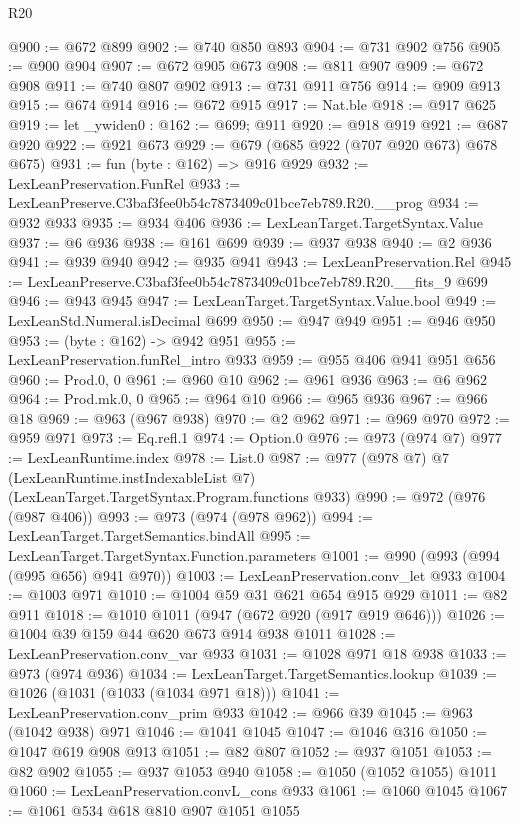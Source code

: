 \begin{lexlean}{R20}
\begin{coremodule}
@900 := @672 @899
@902 := @740 @850 @893
@904 := @731 @902 @756
@905 := @900 @904
@907 := @672 @905 @673
@908 := @811 @907
@909 := @672 @908
@911 := @740 @807 @902
@913 := @731 @911 @756
@914 := @909 @913
@915 := @674 @914
@916 := @672 @915
@917 := Nat.ble
@918 := @917 @625
@919 := let _ywiden0 : @162 := @699; @911
@920 := @918 @919
@921 := @687 @920
@922 := @921 @673
@929 := @679 (@685 @922 (@707 @920 @673) @678 @675)
@931 := fun (byte : @162) => @916 @929
@932 := LexLeanPreservation.FunRel
@933 := LexLeanPreserve.C3baf3fee0b54c7873409c01bce7eb789.R20.__prog
@934 := @932 @933
@935 := @934 @406
@936 := LexLeanTarget.TargetSyntax.Value
@937 := @6 @936
@938 := @161 @699
@939 := @937 @938
@940 := @2 @936
@941 := @939 @940
@942 := @935 @941
@943 := LexLeanPreservation.Rel
@945 := LexLeanPreserve.C3baf3fee0b54c7873409c01bce7eb789.R20.__fits_9 @699
@946 := @943 @945
@947 := LexLeanTarget.TargetSyntax.Value.bool
@949 := LexLeanStd.Numeral.isDecimal @699
@950 := @947 @949
@951 := @946 @950
@953 := (byte : @162) -> @942 @951
@955 := LexLeanPreservation.funRel_intro @933
@959 := @955 @406 @941 @951 @656
@960 := Prod.{0, 0}
@961 := @960 @10
@962 := @961 @936
@963 := @6 @962
@964 := Prod.mk.{0, 0}
@965 := @964 @10
@966 := @965 @936
@967 := @966 @18
@969 := @963 (@967 @938)
@970 := @2 @962
@971 := @969 @970
@972 := @959 @971
@973 := Eq.refl.{1}
@974 := Option.{0}
@976 := @973 (@974 @7)
@977 := LexLeanRuntime.index
@978 := List.{0}
@987 := @977
    (@978 @7)
    @7
    (LexLeanRuntime.instIndexableList @7)
    (LexLeanTarget.TargetSyntax.Program.functions @933)
@990 := @972 (@976 (@987 @406))
@993 := @973 (@974 (@978 @962))
@994 := LexLeanTarget.TargetSemantics.bindAll
@995 := LexLeanTarget.TargetSyntax.Function.parameters
@1001 := @990 (@993 (@994 (@995 @656) @941 @970))
@1003 := LexLeanPreservation.conv_let @933
@1004 := @1003 @971
@1010 := @1004 @59 @31 @621 @654 @915 @929
@1011 := @82 @911
@1018 := @1010 @1011 (@947 (@672 @920 (@917 @919 @646)))
@1026 := @1004 @39 @159 @44 @620 @673 @914 @938 @1011
@1028 := LexLeanPreservation.conv_var @933
@1031 := @1028 @971 @18 @938
@1033 := @973 (@974 @936)
@1034 := LexLeanTarget.TargetSemantics.lookup
@1039 := @1026 (@1031 (@1033 (@1034 @971 @18)))
@1041 := LexLeanPreservation.conv_prim @933
@1042 := @966 @39
@1045 := @963 (@1042 @938) @971
@1046 := @1041 @1045
@1047 := @1046 @316
@1050 := @1047 @619 @908 @913
@1051 := @82 @807
@1052 := @937 @1051
@1053 := @82 @902
@1055 := @937 @1053 @940
@1058 := @1050 (@1052 @1055) @1011
@1060 := LexLeanPreservation.convL_cons @933
@1061 := @1060 @1045
@1067 := @1061 @534 @618 @810 @907 @1051 @1055

\end{coremodule}
\end{lexlean}
